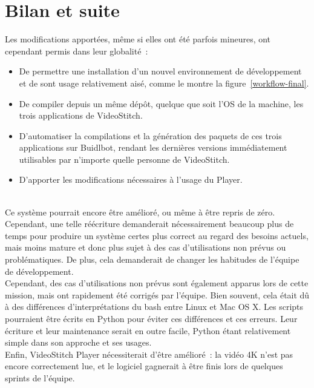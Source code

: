 \section{Bilan et suite}
Les modifications apportées, même si elles ont été parfois mineures, ont cependant permis dans leur globalité~:
\begin{itemize}
 \item De permettre une installation d'un nouvel environnement de développement et
 de sont usage relativement aisé, comme le montre la figure~\ref{workflow-final}.
 \item De compiler depuis un même dépôt, quelque que soit l'OS de la machine, les trois applications de VideoStitch.
 \item D'automatiser la compilations et la génération des paquets de ces trois applications 
 sur Buidlbot, rendant les dernières versions immédiatement utilisables par n'importe 
 quelle personne de VideoStitch.
 \item D'apporter les modifications nécessaires à l'usage du Player.
\end{itemize}
\ \\
Ce système pourrait encore être amélioré, ou même à être repris de zéro. Cependant, 
une telle réécriture demanderait nécessairement beaucoup plus de temps pour
produire un système certes plus correct au regard des besoins actuels, mais moins mature
et donc plus sujet à des cas d'utilisations non prévus ou problématiques. De plus,
cela demanderait de changer les habitudes de l'équipe de développement.\\
Cependant, des cas d'utilisations non prévus sont également apparus lors de cette mission,
mais ont rapidement été corrigés par l'équipe. Bien souvent, cela était dû à des différences
d'interprétations du bash entre Linux et Mac OS X. Les scripts pourraient être écrits en Python pour
éviter ces différences et ces erreurs. Leur écriture et leur maintenance serait 
en outre facile, Python étant relativement simple dans son approche et ses usages.\\
Enfin, VideoStitch Player nécessiterait d'être amélioré~: la vidéo
4K n'est pas encore correctement lue, et le logiciel gagnerait à être finis lors
de quelques sprints de l'équipe.
